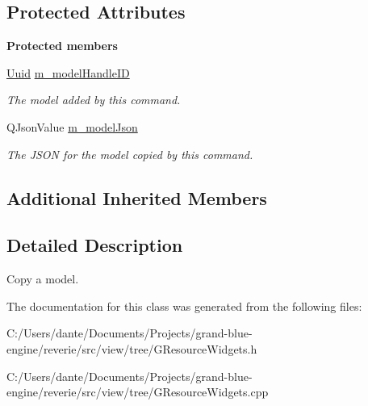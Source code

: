 \subsection*{Protected Attributes}
\begin{Indent}\textbf{ Protected members}\par
\begin{DoxyCompactItemize}
\item 
\mbox{\label{classrev_1_1_copy_model_command_a780bc923805ff73c6af1b831daaad3a8}} 
\mbox{\hyperlink{classrev_1_1_uuid}{Uuid}} \mbox{\hyperlink{classrev_1_1_copy_model_command_a780bc923805ff73c6af1b831daaad3a8}{m\+\_\+model\+Handle\+ID}}
\begin{DoxyCompactList}\small\item\em The model added by this command. \end{DoxyCompactList}\item 
\mbox{\label{classrev_1_1_copy_model_command_a1e52d9f8e2e7c028e1ed2c6ca815d89f}} 
Q\+Json\+Value \mbox{\hyperlink{classrev_1_1_copy_model_command_a1e52d9f8e2e7c028e1ed2c6ca815d89f}{m\+\_\+model\+Json}}
\begin{DoxyCompactList}\small\item\em The J\+S\+ON for the model copied by this command. \end{DoxyCompactList}\end{DoxyCompactItemize}
\end{Indent}
\subsection*{Additional Inherited Members}


\subsection{Detailed Description}
Copy a model. 

The documentation for this class was generated from the following files\+:\begin{DoxyCompactItemize}
\item 
C\+:/\+Users/dante/\+Documents/\+Projects/grand-\/blue-\/engine/reverie/src/view/tree/G\+Resource\+Widgets.\+h\item 
C\+:/\+Users/dante/\+Documents/\+Projects/grand-\/blue-\/engine/reverie/src/view/tree/G\+Resource\+Widgets.\+cpp\end{DoxyCompactItemize}
